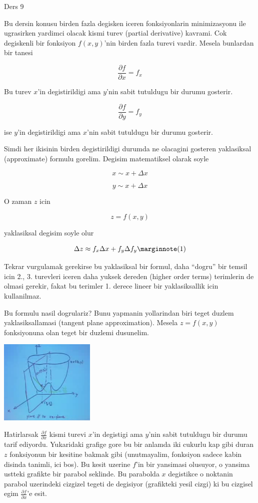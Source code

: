\documentclass[12pt,fleqn]{article}\usepackage{../common}
\begin{document}
Ders 9

Bu dersin konusu birden fazla degisken iceren fonksiyonlarin minimizasyonu
ile ugrasirken yardimci olacak kismi turev (partial derivative)
kavrami. Cok degiskenli bir fonksiyon $f(x,y)$'nin birden fazla turevi
vardir. Mesela bunlardan bir tanesi

\[ \frac{\partial f}{\partial x} = f_x \]

Bu turev $x$'in degistirildigi ama $y$'nin sabit tutuldugu bir durumu
gosterir. 

\[ \frac{\partial f}{\partial y} = f_y \]

ise $y$'in degistirildigi ama $x$'nin sabit tutuldugu bir durumu gosterir.

Simdi her ikisinin birden degistirildigi durumda ne olacagini gosteren
yaklasiksal (approximate) formulu gorelim. Degisim matematiksel olarak
soyle

\[ x \sim x + \Delta x \]

\[ y \sim x + \Delta x \]

O zaman $z$ icin

\[ z = f(x,y) \]

yaklasiksal degisim soyle olur

\[
\Delta z \approx f_x\Delta x + f_y \Delta f_y
\mlabel{1}
\]


Tekrar vurgulamak gerekirse bu yaklasiksal bir formul, daha ``dogru'' bir
temsil icin 2., 3. turevleri iceren daha yuksek dereden (higher order
terms) terimlerin de olmasi gerekir, fakat bu terimler 1. derece lineer bir
yaklasiksallik icin kullanilmaz. 

Bu formulu nasil dogrulariz? Bunu yapmanin yollarindan biri teget duzlem
yaklasiksallamasi (tangent plane approximation). Mesela $z = f(x,y)$
fonksiyonuna olan teget bir duzlemi dusunelim.

\includegraphics[height=4cm]{9_1.png}

Hatirlarsak $\frac{\partial f}{\partial x}$ kismi turevi $x$'in degistigi
ama $y$'nin sabit tutuldugu bir durumu tarif ediyordu. Yukaridaki grafige
gore bu bir anlamda iki cukurlu kap gibi duran $z$ fonksiyonun bir kesitine
bakmak gibi (unutmayalim, fonksiyon sadece kabin disinda tanimli, ici
bos). Bu kesit uzerine $f$'in bir yansimasi olusuyor, o yansima ustteki
grafikte bir parabol seklinde. Bu parabolda $x$ degistikce o noktanin
parabol uzerindeki cizgizel tegeti de degisiyor (grafikteki yesil cizgi) ki
bu cizgisel egim $\frac{\partial f}{\partial x}$'e esit.
\end{document}
